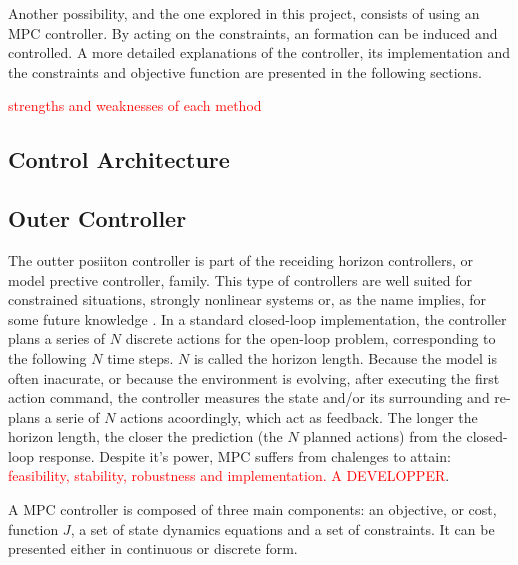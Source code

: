\documentclass[a4paper, 12pt]{report}
\begin{document}
Another possibility, and the one explored in this project, consists of using an MPC controller. By acting on the constraints, an formation can be induced and controlled. A more detailed explanations of the controller, its implementation and the constraints and objective function are presented in the following sections.

\textcolor{red}{strengths and weaknesses of each method}
\subsection{Control Architecture}

\subsection{Outer Controller}

The outter posiiton controller is part of the receiding horizon controllers, or model prective controller, family. This type of controllers are well suited for constrained situations, strongly nonlinear systems or, as the name implies, for some future knowledge \cite{Borelli2015}. In a standard closed-loop implementation, the controller plans a series of $N$ discrete actions for the open-loop problem, corresponding to the following $N$ time steps. $N$ is called the horizon length. Because the model is often inacurate, or because the environment is evolving, after executing the first action command, the controller measures the state and/or its surrounding and re-plans a serie of $N$ actions acoordingly, which act as feedback. The longer the horizon length, the closer the prediction (the $N$ planned actions) from the closed-loop response. Despite it's power, MPC suffers from chalenges to attain: \textcolor{red}{feasibility, stability, robustness and implementation. A DEVELOPPER}.

A MPC controller is composed of three main components: an objective, or cost, function $J$, a set of state dynamics equations and a set of constraints. It can be presented either in continuous or discrete form.
\end{document}
